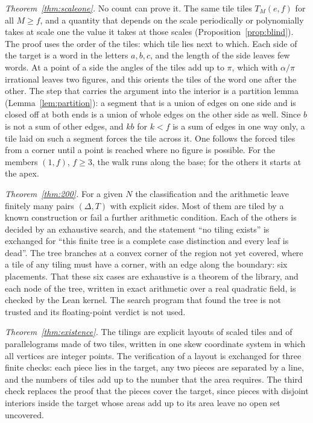 \documentclass[11pt,reqno]{amsart}
\theoremstyle{plain}
\theoremstyle{definition}
\begin{document}
\emph{Theorem~\ref{thm:scaleone}.} No count can prove it. The same tile tiles $T_M(e,f)$ for all $M\ge f$,
and a quantity that depends on the scale periodically or polynomially takes at scale one the value it takes
at those scales (Proposition~\ref{prop:blind}). The proof uses the order of the tiles: which tile lies next
to which. Each side of the target is a word in the letters $a,b,c$, and the length of the side leaves few
words. At a point of a side the angles of the tiles add up to $\pi$, which with $\alpha/\pi$ irrational
leaves two figures, and this orients the tiles of the word one after the other. The step that carries the
argument into the interior is a partition lemma (Lemma~\ref{lem:partition}): a segment that is a union of
edges on one side and is closed off at both ends is a union of whole edges on the other side as well. Since
$b$ is not a sum of other edges, and $kb$ for $k<f$ is a sum of edges in one way only, a tile laid on such a
segment forces the tile across it. One follows the forced tiles from a corner until a point is reached where
no figure is possible. For the members $(1,f)$, $f\ge3$, the walk runs along the base; for the others it
starts at the apex.

\emph{Theorem~\ref{thm:200}.} For a given $N$ the classification and the arithmetic leave finitely many
pairs $(\Delta,T)$ with explicit sides. Most of them are tiled by a known construction or fail a further
arithmetic condition. Each of the others is decided by an exhaustive search, and the statement ``no tiling
exists'' is exchanged for ``this finite tree is a complete case distinction and every leaf is dead''. The
tree branches at a convex corner of the region not yet covered, where a tile of any tiling must have a
corner, with an edge along the boundary: six placements. That these six cases are exhaustive is a theorem of
the library, and each node of the tree, written in exact arithmetic over a real quadratic field, is checked
by the Lean kernel. The search program that found the tree is not trusted and its floating-point verdict is
not used.

\emph{Theorem~\ref{thm:existence}.} The tilings are explicit layouts of scaled tiles and of parallelograms
made of two tiles, written in one skew coordinate system in which all vertices are integer points. The
verification of a layout is exchanged for three finite checks: each piece lies in the target, any two pieces
are separated by a line, and the numbers of tiles add up to the number that the area requires. The third
check replaces the proof that the pieces cover the target, since pieces with disjoint interiors inside the
target whose areas add up to its area leave no open set uncovered.
\end{document}
